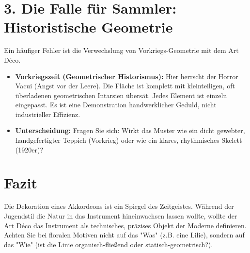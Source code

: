 \documentclass[11pt,a4paper]{article}
\begin{document}
	\section*{3. Die Falle für Sammler: Historistische Geometrie}
	Ein häufiger Fehler ist die Verwechslung von Vorkriegs-Geometrie mit dem Art Déco.
	
	\begin{itemize}
		\item \textbf{Vorkriegszeit (Geometrischer Historismus):} Hier herrscht der Horror Vacui (Angst vor der Leere). Die Fläche ist komplett mit kleinteiligen, oft überladenen geometrischen Intarsien übersät. Jedes Element ist einzeln eingepasst. Es ist eine Demonstration handwerklicher Geduld, nicht industrieller Effizienz.
		\item \textbf{Unterscheidung:} Fragen Sie sich: Wirkt das Muster wie ein dicht gewebter, handgefertigter Teppich (Vorkrieg) oder wie ein klares, rhythmisches Skelett (1920er)? 
	\end{itemize}
	
	\section*{Fazit}
	Die Dekoration eines Akkordeons ist ein Spiegel des Zeitgeistes. Während der Jugendstil die Natur in das Instrument hineinwachsen lassen wollte, wollte der Art Déco das Instrument als technisches, präzises Objekt der Moderne definieren. Achten Sie bei floralen Motiven nicht auf das "Was" (z.B. eine Lilie), sondern auf das "Wie" (ist die Linie organisch-fließend oder statisch-geometrisch?).
	
\end{document}
